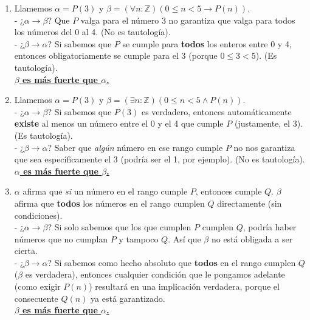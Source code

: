 \begin{enumerate}[label=\textbf{\alph*)}]

    \item Llamemos $\alpha = P(3)$ y $\beta = (\forall n: \mathbb{Z}) (0 \leq n < 5 \rightarrow P(n))$. \\
    - ¿$\alpha \rightarrow \beta$? Que $P$ valga para el número 3 no garantiza que valga para todos los números del 0 al 4. (No es tautología). \\
    - ¿$\beta \rightarrow \alpha$? Si sabemos que $P$ se cumple para \textbf{todos} los enteros entre 0 y 4, entonces obligatoriamente se cumple para el 3 (porque $0 \leq 3 < 5$). (Es tautología). \\
    \underline{\textbf{$\beta$ es más fuerte que $\alpha$.}}

    \vspace{0.4cm}
    \item Llamemos $\alpha = P(3)$ y $\beta = (\exists n: \mathbb{Z}) (0 \leq n < 5 \wedge P(n))$. \\
    - ¿$\alpha \rightarrow \beta$? Si sabemos que $P(3)$ es verdadero, entonces automáticamente \textbf{existe} al menos un número entre el 0 y el 4 que cumple $P$ (justamente, el 3). (Es tautología). \\
    - ¿$\beta \rightarrow \alpha$? Saber que \textit{algún} número en ese rango cumple $P$ no nos garantiza que sea específicamente el 3 (podría ser el 1, por ejemplo). (No es tautología). \\
    \underline{\textbf{$\alpha$ es más fuerte que $\beta$.}}

    \vspace{0.4cm}
    \item $\alpha$ afirma que \textit{si} un número en el rango cumple $P$, entonces cumple $Q$. $\beta$ afirma que \textbf{todos} los números en el rango cumplen $Q$ directamente (sin condiciones). \\
    - ¿$\alpha \rightarrow \beta$? Si solo sabemos que los que cumplen $P$ cumplen $Q$, podría haber números que no cumplan $P$ y tampoco $Q$. Así que $\beta$ no está obligada a ser cierta. \\
    - ¿$\beta \rightarrow \alpha$? Si sabemos como hecho absoluto que \textbf{todos} en el rango cumplen $Q$ ($\beta$ es verdadera), entonces cualquier condición que le pongamos adelante (como exigir $P(n)$) resultará en una implicación verdadera, porque el consecuente $Q(n)$ ya está garantizado. \\
    \underline{\textbf{$\beta$ es más fuerte que $\alpha$.}}


\end{enumerate}

